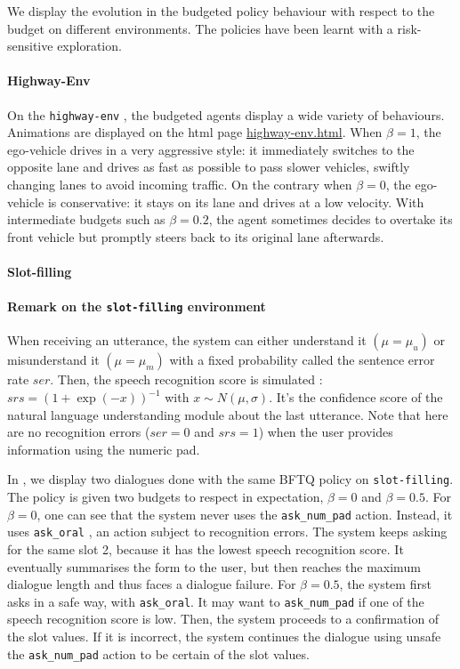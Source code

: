 We display the evolution in the budgeted policy behaviour with respect to the budget on different environments. The policies have been learnt with a risk-sensitive exploration.

\paragraph{Highway-Env}

On the \texttt{highway-env} , the budgeted agents display a wide variety of behaviours. Animations are displayed on the html page \url{highway-env.html}. When $\beta = 1$, the ego-vehicle drives in a very aggressive style: it immediately switches to the opposite lane and drives as fast as possible to pass slower vehicles, swiftly changing lanes to avoid incoming traffic. On the contrary when $\beta = 0$, the ego-vehicle is conservative: it stays on its lane and drives at a low velocity. With intermediate budgets such as $\beta = 0.2$, the agent sometimes decides to overtake its front vehicle but promptly steers back to its original lane afterwards.

\paragraph{Slot-filling}

\paragraph{Remark on the \texttt{slot-filling} environment} When receiving an utterance, the system can either understand it $(\mu=\mu_u)$ or misunderstand it $(\mu=\mu_m)$ with a fixed probability called the sentence error rate $ser$. Then, the speech recognition score is simulated \citep{Khouzaimi2015}: $srs = (1+\exp(-x))^{-1}$ with $x\sim N(\mu, \sigma)$. It's the confidence score of the natural language understanding module about the last utterance. Note that here are no recognition errors ($ser=0$ and $srs=1$) when the user provides information using the numeric pad.

In , we display two dialogues done with the same BFTQ policy on \texttt{slot-filling}. The policy is given two budgets to respect in expectation, $\beta=0$ and $\beta=0.5$. For $\beta=0$, one can see that the system never uses the \texttt{ask\_num\_pad} action. Instead, it uses \texttt{ask\_oral} , an action subject to recognition errors. The system keeps asking for the same slot 2, because it has the lowest speech recognition score. It eventually summarises the form to the user, but then reaches the maximum dialogue length and thus faces a dialogue failure. For $\beta=0.5$, the system first asks in a safe way, with \texttt{ask\_oral}. It may want to \texttt{ask\_num\_pad} if one of the speech recognition score is low. Then, the system proceeds to a confirmation of the slot values. If it is incorrect, the system continues the dialogue using unsafe the \texttt{ask\_num\_pad} action to be certain of the slot values.

